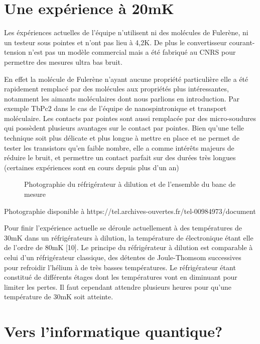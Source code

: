 \section{Une expérience à 20mK}
Les éxpériences actuelles de l’équipe n’utilisent ni des molécules de Fulerène, ni un testeur sous pointes et n’ont pas lieu à 4,2K. De plus le convertisseur courant-tension n’est pas un modèle commercial mais a été fabriqué au CNRS pour permettre des mesures ultra bas bruit.

En effet la molécule de Fulerène n’ayant aucune propriété particulière elle a été rapidement remplacé par des molécules aux propriétés plus intéressantes, notamment les aimants moléculaires dont nous parlions en introduction. Par exemple TbPc2 dans le cas de l’équipe de nanospintronique et transport moléculaire.
Les contacts par pointes sont aussi remplacée par des micro-soudures qui possèdent plusieurs avantages sur le contact par pointes. Bien qu’une telle technique soit plus délicate et plus longue à mettre en place et ne permet de tester les transistors qu’en faible nombre, elle a comme intérêts majeurs de réduire le bruit, et permettre un contact parfait sur des durées très longues (certaines expériences sont en cours depuis plus d’un an)

\begin{figure}[h]
    \begin{center}
        \caption{Photographie du réfrigérateur à dilution et de l’ensemble du banc de mesure}
        \label{fig:}
    \end{center}
\end{figure}
Photographie disponible à https://tel.archives-ouvertes.fr/tel-00984973/document

Pour finir l’expérience actuelle se déroule actuellement à des températures de 30mK dans un réfrigérateurs à dilution, la température de électronique étant elle de l’ordre de 80mK [10]. Le principe du réfrigérateur à dilution est comparable à celui d’un réfrigérateur classique, des détentes de Joule-Thomsom successives pour refroidir l’hélium à de très basses températures. Le réfrigérateur étant constitué de différents étages dont les températures vont en diminuant pour limiter les pertes. Il faut cependant attendre plusieurs heures pour qu’une température de 30mK soit atteinte.
\section{Vers l'informatique quantique?}
